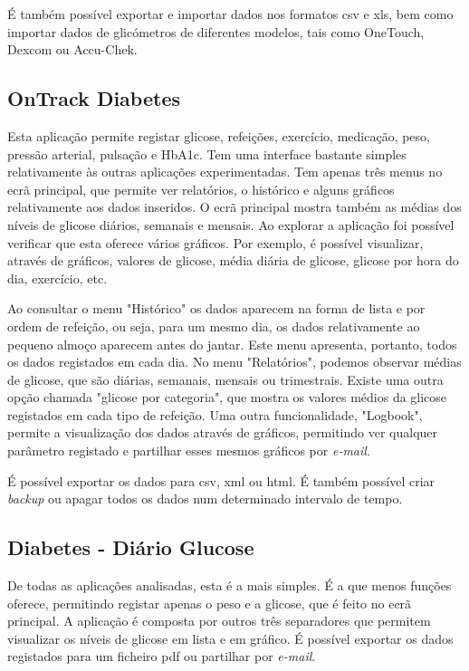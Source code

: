 É também possível exportar e importar dados nos formatos csv e xls, bem como importar dados de glicómetros de diferentes modelos, tais como OneTouch, Dexcom ou Accu-Chek.

\subsection{OnTrack Diabetes}

Esta aplicação permite registar glicose, refeições, exercício, medicação, peso, pressão arterial, pulsação e HbA1c. Tem uma interface bastante simples relativamente às outras aplicações experimentadas. Tem apenas três menus no ecrã principal, que permite ver relatórios, o histórico e alguns gráficos relativamente aos dados inseridos. O ecrã principal mostra também as médias dos níveis de glicose diários, semanais e mensais. Ao explorar a aplicação foi possível verificar que esta oferece vários gráficos. Por exemplo, é possível visualizar, através de gráficos, valores de glicose, média diária de glicose, glicose por hora do dia, exercício, etc.

Ao consultar o menu "Histórico" os dados aparecem na forma de lista e por ordem de refeição, ou seja, para um mesmo dia, os dados relativamente ao pequeno almoço aparecem antes do jantar. Este menu apresenta, portanto, todos os dados registados em cada dia. 
No menu "Relatórios", podemos observar médias de glicose, que são diárias, semanais, mensais ou trimestrais. Existe uma outra opção chamada "glicose por categoria", que mostra os valores médios da glicose registados em cada tipo de refeição.
Uma outra funcionalidade, "Logbook", permite a visualização dos dados através de gráficos, permitindo ver qualquer parâmetro registado e partilhar esses mesmos gráficos por \textit{e-mail}.

É possível exportar os dados para csv, xml ou html. É também possível criar \textit{backup} ou apagar todos os dados num determinado intervalo de tempo.

\subsection{Diabetes - Diário Glucose}

De todas as aplicações analisadas, esta é a mais simples. É a que menos funções oferece, permitindo registar apenas o peso e a glicose, que é feito no ecrã principal. A aplicação é composta por outros três separadores que permitem visualizar os níveis de glicose em lista e em gráfico. É possível exportar os dados registados para um ficheiro pdf ou partilhar por \textit{e-mail}.

